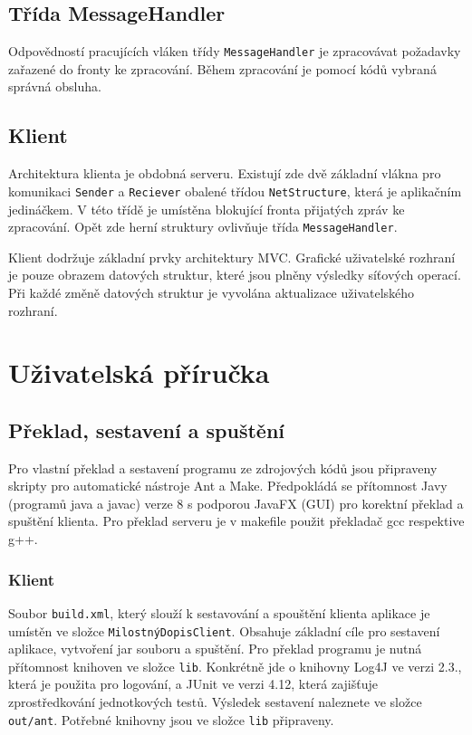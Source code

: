 \documentclass[12pt, a4paper]{article}
\begin{document}
\subsection{Třída MessageHandler}
Odpovědností pracujících vláken třídy \texttt{MessageHandler} je zpracovávat požadavky zařazené do fronty ke zpracování. Během zpracování je pomocí kódů vybraná správná obsluha.


\subsection{Klient}

Architektura klienta je obdobná serveru. Existují zde dvě základní vlákna pro komunikaci \texttt{Sender} a \texttt{Reciever} obalené třídou \texttt{NetStructure}, která je aplikačním jedináčkem. V této třídě je umístěna blokující fronta přijatých zpráv ke zpracování. Opět zde herní struktury ovlivňuje třída \texttt{MessageHandler}.

Klient dodržuje základní prvky architektury MVC. Grafické uživatelské rozhraní je pouze obrazem datových struktur, které jsou plněny výsledky síťových operací. Při každé změně datových struktur je vyvolána aktualizace uživatelského rozhraní.


\section{Uživatelská příručka} %

\subsection{Překlad, sestavení a spuštění }

Pro vlastní překlad a sestavení programu ze zdrojových kódů jsou připraveny skripty pro automatické nástroje Ant a Make. Předpokládá se přítomnost Javy (programů java a javac) verze 8 s podporou JavaFX (GUI) pro korektní překlad a spuštění klienta. Pro překlad serveru je v makefile použit překladač gcc respektive g++.


\subsubsection{Klient}
Soubor \texttt{build.xml}, který slouží k sestavování a spouštění klienta aplikace je umístěn ve složce \texttt{MilostnýDopisClient}. Obsahuje základní cíle pro sestavení aplikace, vytvoření jar souboru a spuštění. Pro překlad programu je nutná přítomnost knihoven ve složce \texttt{lib}. Konkrétně jde o knihovny Log4J ve verzi 2.3., která je použita pro logování, a JUnit ve verzi 4.12, která zajišťuje zprostředkování jednotkových testů. Výsledek sestavení naleznete ve složce \texttt{out/ant}. Potřebné knihovny jsou ve složce \texttt{lib} připraveny.
\end{document}
